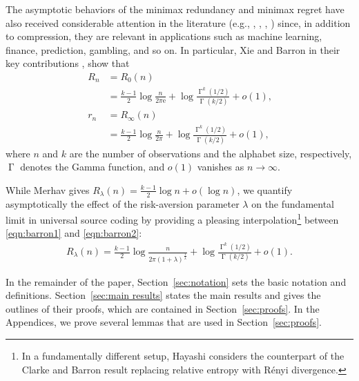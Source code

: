 \documentclass[journal, 10pt]{IEEEtran}
\newcommand{\rme}{\mathrm{e}}
\theoremstyle{plain}
\theoremstyle{plain}
\theoremstyle{plain}
\theoremstyle{plain}
\newcommand{\opGamma}{\operatorname{\Gamma}}
\begin{document}
The asymptotic behaviors of the minimax redundancy and minimax regret have also received considerable attention in the literature (e.g., \cite{XieBarron2000}, \cite{Shtarkov87}, \cite{Dramota04}, \cite{XieBarron1997, Davisson81, Gyorfi94, KriTro81, Rissanen84, Rissanen86}) since, in addition to compression, they are relevant in applications such as machine learning, finance, prediction, gambling, and so on. In particular, Xie and Barron in their key contributions \cite{XieBarron1997}, \cite{XieBarron2000}  show that 
\begin{align}
	R_n&=R_0(n) \\ 
	 &=\frac{k-1}{2}\log \frac{n}{2\pi \rme}+\log \frac{\opGamma^k(1/2)}{\opGamma(k/2)} + o(1)\text{,} \label{eqn:barron1} \\
	r_n&=R_\infty(n) \\
	&=\frac{k-1}{2}\log \frac{n}{2\pi}+\log \frac{\opGamma^k(1/2)}{\opGamma(k/2)} +o(1)\text{,} \label{eqn:barron2}
\end{align}
where $n$ and $k$ are the number of observations and the alphabet size, respectively, $\opGamma$ denotes the Gamma function, and $o(1)$ vanishes as $n\to \infty$.

While Merhav \cite[Theorem 1]{Merhav11} gives $R_\lambda(n) = \frac{k-1}{2}\log n +o(\log n) $, we quantify asymptotically the effect of the risk-aversion parameter $\lambda$ on the fundamental limit in universal source coding by providing a pleasing interpolation\footnote{In a fundamentally different setup, Hayashi \cite[Lemma 3]{Hayashi17} considers the counterpart of the Clarke and Barron \cite[Theorem 2.1]{ClarkeBarron} result replacing relative entropy with R\'enyi divergence.} between \eqref{eqn:barron1} and \eqref{eqn:barron2}: 
\begin{align}
 R_\lambda (n) = \frac{k-1}{2}\log \frac{n}{2\pi(1+\lambda)^{\frac 1\lambda} }+\log \frac{\opGamma^k(1/2)}{\opGamma(k/2)} 
 +o(1)\text{.}  
\label{aaab}
\end{align}

In the remainder of the paper, Section~\ref{sec:notation} sets the basic notation and definitions. Section~\ref{sec:main results} states the main results and gives the outlines of their proofs, which are contained in Section~\ref{sec:proofs}. In the Appendices, we prove several lemmas that are used in Section~\ref{sec:proofs}.
\end{document}
